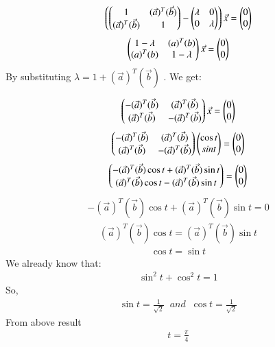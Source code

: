 \documentclass[journal]{IEEEtran}
\theoremstyle{remark}
\begin{document}
\begin{align}
    \left(\begin{pmatrix}1&(\Vec{a})^T(\Vec{b})\\(\Vec{a})^T(\Vec{b})&1\end{pmatrix}-\begin{pmatrix}\lambda&0\\0&\lambda\end{pmatrix}\right)\Vec{x}=\begin{pmatrix}0\\0\end{pmatrix}
\end{align}
\begin{align}
    \begin{pmatrix}1-\lambda&(a)^T(b)\\(a)^T(b)&1-\lambda\end{pmatrix}\Vec{x}=\begin{pmatrix}0\\0\end{pmatrix}
\end{align}
By substituting  $\lambda = 1+  (\Vec{a})^T(\Vec{b}) $ . We get:

\begin{align}
    \begin{pmatrix}-(\Vec{a})^T(\Vec{b})&(\Vec{a})^T(\Vec{b})\\(\Vec{a})^T(\Vec{b})&-(\Vec{a})^T(\Vec{b})\end{pmatrix}\Vec{x}=\begin{pmatrix}0\\0\end{pmatrix}
\end{align}
\begin{align}
    \begin{pmatrix}-(\Vec{a})^T(\Vec{b})&(\Vec{a})^T(\Vec{b})\\(\Vec{a})^T(\Vec{b})&-(\Vec{a})^T(\Vec{b})\end{pmatrix}\begin{pmatrix}\cos{t}\\sin{t}\end{pmatrix}=\begin{pmatrix}0\\0\end{pmatrix}
\end{align}
\begin{align}
    \begin{pmatrix}-(\Vec{a})^T(\Vec{b})\cos{t}+(\Vec{a})^T(\Vec{b})\sin{t}\\(\Vec{a})^T(\Vec{b})\cos{t}-(\Vec{a})^T(\Vec{b})\sin{t}\end{pmatrix}=\begin{pmatrix}0\\0\end{pmatrix}
\end{align}
\begin{align}
    -(\Vec{a})^T(\Vec{b})\cos{t}+(\Vec{a})^T(\Vec{b})\sin{t}=0
\end{align}
\begin{align}
    (\Vec{a})^T(\Vec{b})\cos{t}=(\Vec{a})^T(\Vec{b})\sin{t}
\end{align}
\begin{align}
    \cos{t}=\sin{t}
\end{align}
We already know that:
\begin{align}
    \sin^2{t}+\cos^2{t}=1
\end{align}
So,
\begin{align}
    \sin{t}=\frac{1}{\sqrt{2}}\;\;and\;\; \cos{t}=\frac{1}{\sqrt{2}}
\end{align}
From above result
\begin{align}
    t=\frac{\pi}{4}
\end{align}
\end{document}

